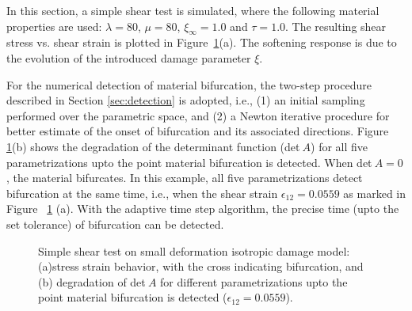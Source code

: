 \documentclass[12pt]{article}
\numberwithin{equation}{section}
\begin{document}
In this section, a simple shear test is simulated, where the following
material properties are used: $\lambda = 80$, $\mu = 80$,
$\xi_{\infty} = 1.0$ and $\tau = 1.0$. The resulting shear stress vs.
shear strain is plotted in Figure~\ref{fig:iso_stress_strain}(a). The
softening response is due to the evolution of the introduced damage
parameter $\xi$.

For the numerical detection of material bifurcation, the two-step
procedure described in Section \ref{sec:detection} is adopted, i.e.,
(1) an initial sampling performed over the parametric space, and (2) a
Newton iterative procedure for better estimate of the onset of
bifurcation and its associated directions. Figure~
\ref{fig:iso_stress_strain}(b) shows the degradation of the
determinant function (det$~A$) for all five parametrizations upto the
point material bifurcation is detected. When det$~A = 0$, the
material bifurcates. In this example, all five parametrizations detect
bifurcation at the same time, i.e., when the shear strain
$\epsilon_{12}=0.0559$ as marked in Figure~
\ref{fig:iso_stress_strain} (a). With the adaptive time step
algorithm, the precise time (upto the set tolerance) of bifurcation
can be detected.

\begin{figure}[H]
  \centering {} 
  \caption{Simple shear test on small deformation
  isotropic damage model:
  (a)stress strain behavior, with the cross indicating bifurcation, and
  (b) degradation of det$~A$ for different
  parametrizations upto the point material bifurcation is detected ($\epsilon_{12}=0.0559$).}
  \label{fig:iso_stress_strain}
\end{figure}
\end{document}
